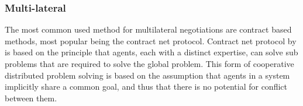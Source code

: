 
\subsubsection{Multi-lateral}
\label{sec:lit:neg:multilateral}
The most common used method for multilateral negotiations are contract based methods, most popular being the contract net protocol. Contract net protocol by \citet{smith1980communication} is based on the principle that agents, each with a distinct expertise, can solve sub problems that are required to solve the global problem. This form of cooperative distributed problem solving is based on the assumption that agents in a system implicitly share a common goal, and thus that there is no potential for conflict between them.

